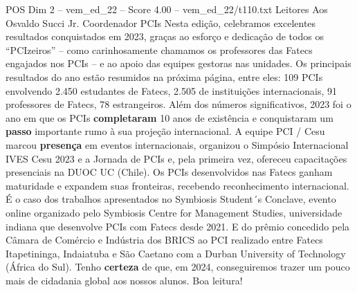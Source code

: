 \begin{textsample}{POS Dim 2 – vem\_ed\_22 – Score 4.00 – vem\_ed\_22/t110.txt}  \label{ex:f2_pos_177}
Leitores Aos Osvaldo Succi Jr.
Coordenador PCIs Nesta edição, celebramos excelentes resultados conquistados em 2023, graças ao esforço e dedicação de todos os “PCIzeiros” – como carinhosamente chamamos os professores das Fatecs engajados nos PCIs – e ao apoio das equipes gestoras nas unidades.
Os principais resultados do ano estão resumidos na próxima página, entre eles: 109 PCIs envolvendo 2.450 estudantes de Fatecs, 2.505 de instituições internacionais, 91 professores de Fatecs, 78 estrangeiros.
Além dos números significativos, 2023 foi o ano em que os PCIs \textbf{completaram} 10 anos de existência e conquistaram um \textbf{passo} importante rumo à sua projeção internacional.
A equipe PCI / Cesu marcou \textbf{presença} em eventos internacionais, organizou o Simpósio Internacional IVES Cesu 2023 e a Jornada de PCIs e, pela primeira vez, ofereceu capacitações presenciais na DUOC UC (Chile).
Os PCIs desenvolvidos nas Fatecs ganham maturidade e expandem suas fronteiras, recebendo reconhecimento internacional.
É o caso dos trabalhos apresentados no Symbiosis Student´s Conclave, evento online organizado pelo Symbiosis Centre for Management Studies, universidade indiana que desenvolve PCIs com Fatecs desde 2021.
E do prêmio concedido pela Câmara de Comércio e Indústria dos BRICS ao PCI realizado entre Fatecs Itapetininga, Indaiatuba e São Caetano com a Durban University of Technology (África do Sul).
Tenho \textbf{certeza} de que, em 2024, conseguiremos trazer um pouco mais de cidadania global aos nossos alunos.
Boa leitura!

\end{textsample}
